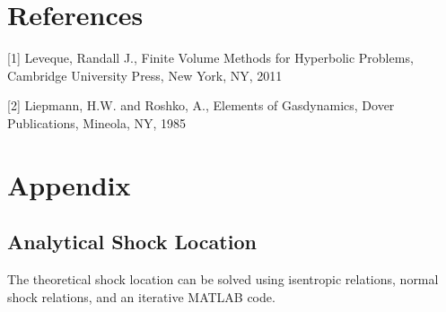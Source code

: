 \documentclass{article}%
\numberwithin{equation}{section}
\begin{document}
\pagebreak
\section*{References}
[1] Leveque, Randall J., Finite Volume Methods for Hyperbolic Problems, Cambridge University Press, New York, NY, 2011

[2] Liepmann, H.W. and Roshko, A., Elements of Gasdynamics, Dover Publications, Mineola, NY, 1985


\section*{Appendix}
\subsection*{Analytical Shock Location}

The theoretical shock location can be solved using isentropic relations, normal shock relations, and an iterative MATLAB code.
\end{document}
